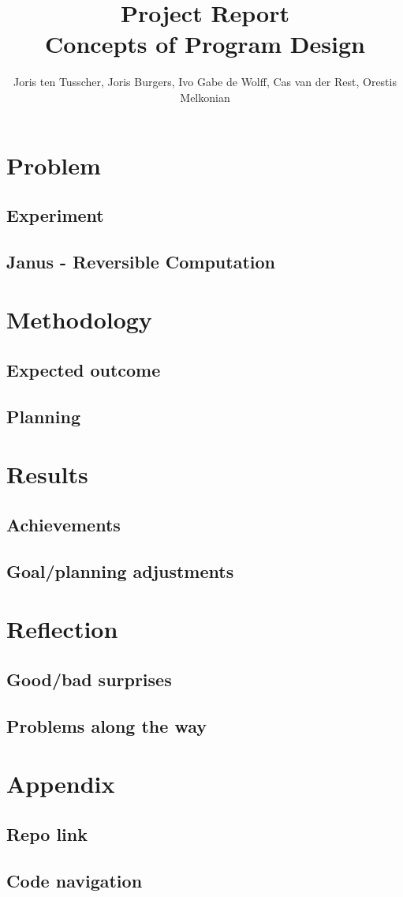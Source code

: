 \documentclass[12pt,a4paper]{article}
\title{\textbf{Project Report \\ \small{Concepts of Program Design}}}
\author{\small{Joris ten Tusscher, Joris Burgers, Ivo Gabe de Wolff, Cas van der Rest, Orestis Melkonian}}
\date{}
\begin{document}
\maketitle

\section{Problem}
    \subsection{Experiment}
    \subsection{Janus - Reversible Computation}
\section{Methodology}
	\subsection{Expected outcome}
	\subsection{Planning}
\section{Results}
	\subsection{Achievements}
	\subsection{Goal/planning adjustments}
\section{Reflection}
	\subsection{Good/bad surprises}
	\subsection{Problems along the way}
\section{Appendix}
	\subsection{Repo link}
	\subsection{Code navigation}

\newpage


\end{document}
